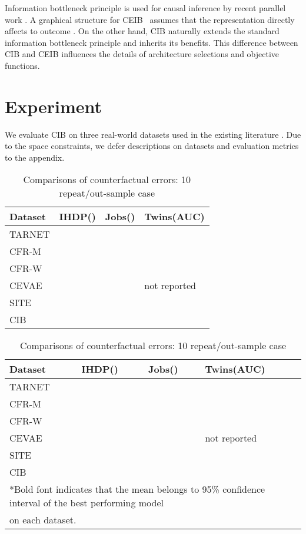 \documentclass{article}
\begin{document}
     Information bottleneck principle is used for causal inference by recent parallel work \cite{parbhoo2018causal}. A graphical structure for CEIB~\cite{parbhoo2018causal} assumes that the representation  directly affects to outcome . On the other hand, CIB naturally extends the standard information bottleneck principle and inherits its benefits. This difference between CIB and CEIB influences the details of architecture selections and objective functions. 
     


\section{Experiment}
We evaluate CIB on three real-world datasets used in the existing literature \cite{johansson16, Shalit17, Louizos17}. Due to the space constraints, we defer descriptions on datasets and evaluation metrics to the appendix. 
\begin{table}[t]
\caption{Comparisons of counterfactual errors: 10 repeat/in-sample case}
  \label{metric-in}
  \centering
  {\scriptsize\begin{tabular}{l>{\centering\arraybackslash}p{2.5cm}>{\centering\arraybackslash}p{2.5cm}>{\centering\arraybackslash}p{2.5cm}}
    \toprule
    Dataset & IHDP() & Jobs() & Twins(AUC) \\
    \midrule
    TARNET &  &  &  \\
    CFR-M &  &  &  \\
    CFR-W &  &  &  \\
    CEVAE &  &  & not reported\\
    SITE &  &  & \\
    \midrule
    CIB &  &  &  \\
    \bottomrule
\end{tabular}}
\caption{Comparisons of counterfactual errors: 10 repeat/out-sample case}
  \label{metric-out}
  \centering
  {\scriptsize\begin{tabular}{l>{\centering\arraybackslash}p{2.5cm}>{\centering\arraybackslash}p{2.5cm}>{\centering\arraybackslash}p{2.5cm}}
    \toprule
    Dataset & IHDP() & Jobs() & Twins(AUC) \\
    \midrule
    TARNET &  &  &  \\
    CFR-M &  &  &  \\
    CFR-W &  &  &  \\
    CEVAE &  &  & not reported\\
    SITE &  &  & \\
    \midrule
    CIB &  &  &  \\
    \bottomrule
    \multicolumn{4}{l}{*Bold font indicates that the mean belongs to 95\% confidence interval of the best performing model} \\
    \multicolumn{4}{l}{on each dataset.} \\
  \end{tabular}}
  \vspace{-15pt}
\end{table}  
\end{document}
